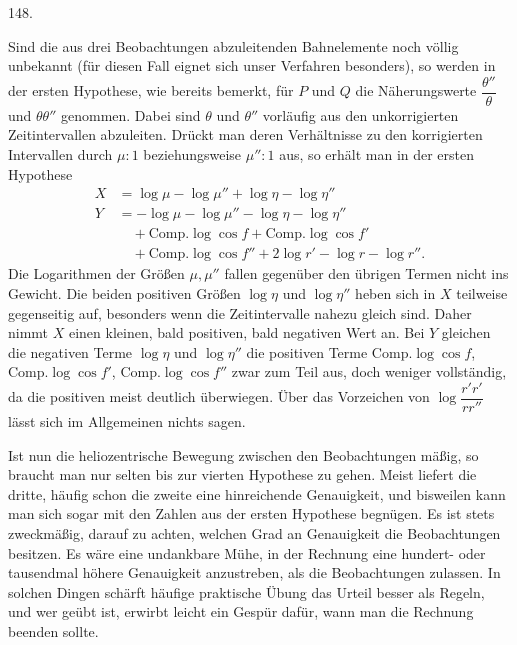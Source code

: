 \par{}\medskip
\begin{center}\hypertarget{native-198-article148}{}148.\end{center}
Sind die aus drei Beobachtungen abzuleitenden Bahnelemente noch völlig unbekannt (für diesen Fall eignet sich unser Verfahren besonders), so werden in der ersten Hypothese, wie bereits bemerkt, für $P$ und $Q$ die Näherungswerte $\dfrac{\theta''}{\theta}$ und $\theta\theta''$ genommen. Dabei sind $\theta$ und $\theta''$ vorläufig aus den unkorrigierten Zeitintervallen abzuleiten. Drückt man deren Verhältnisse zu den korrigierten Intervallen durch $\mu:1$ beziehungsweise $\mu'':1$ aus, so erhält man in der ersten Hypothese
\[
\begin{aligned}
X&=\log\mu-\log\mu''+\log\eta-\log\eta''\\
Y&=-\log\mu-\log\mu''-\log\eta-\log\eta''\\
&\quad+\mathrm{Comp.}\log\cos f+\mathrm{Comp.}\log\cos f'\\
&\quad+\mathrm{Comp.}\log\cos f''+2\log r'-\log r-\log r''.
\end{aligned}
\]
Die Logarithmen der Größen $\mu,\mu''$ fallen gegenüber den übrigen Termen nicht ins Gewicht. Die beiden positiven Größen $\log\eta$ und $\log\eta''$ heben sich in $X$ teilweise gegenseitig auf, besonders wenn die Zeitintervalle nahezu gleich sind. Daher nimmt $X$ einen kleinen, bald positiven, bald negativen Wert an. Bei $Y$ gleichen die negativen Terme $\log\eta$ und $\log\eta''$ die positiven Terme $\mathrm{Comp.}\log\cos f$, $\mathrm{Comp.}\log\cos f'$, $\mathrm{Comp.}\log\cos f''$ zwar zum Teil aus, doch weniger vollständig, da die positiven meist deutlich überwiegen. Über das Vorzeichen von $\log\dfrac{r'r'}{rr''}$ lässt sich im Allgemeinen nichts sagen.

Ist nun die heliozentrische Bewegung zwischen den Beobachtungen mäßig, so braucht man nur selten bis zur vierten Hypothese zu gehen. Meist liefert die dritte, häufig
schon die zweite eine hinreichende Genauigkeit, und bisweilen kann man sich sogar mit den Zahlen aus der ersten Hypothese begnügen. Es ist stets zweckmäßig, darauf zu achten, welchen Grad an Genauigkeit die Beobachtungen besitzen. Es wäre eine undankbare Mühe, in der Rechnung eine hundert- oder tausendmal höhere Genauigkeit anzustreben, als die Beobachtungen zulassen. In solchen Dingen schärft häufige praktische Übung das Urteil besser als Regeln, und wer geübt ist, erwirbt leicht ein Gespür dafür, wann man die Rechnung beenden sollte.
